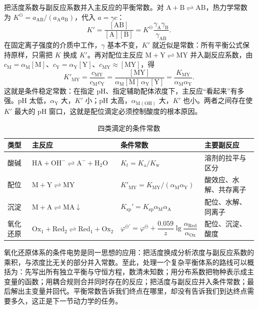 \documentclass[UTF8]{ctexbook}
\begin{document}
把活度系数与副反应系数并入主反应的平衡常数。对 \(\mathrm{A}+\mathrm{B}\rightleftharpoons\mathrm{AB}\)，热力学常数为 \(K^{\ominus}=a_{\mathrm{AB}}/(a_{\mathrm{A}}a_{\mathrm{B}})\)，代入 \(a=\gamma c\)：
\[
K'=\frac{[\mathrm{AB}]}{[\mathrm{A}][\mathrm{B}]}
=K^{\ominus}\frac{\gamma_{\mathrm{A}}\gamma_{\mathrm{B}}}{\gamma_{\mathrm{AB}}}.
\]
在固定离子强度的介质中工作，\(\gamma\) 基本不变，\(K'\) 就近似是常数：所有平衡公式保持原样，只需把 \(K\) 换成 \(K'\)。再对配位主反应 \(\mathrm{M}+\mathrm{Y}\rightleftharpoons\mathrm{MY}\) 并入副反应系数，由 \(c_{\mathrm{M}}=\alpha_{\mathrm{M}}[\mathrm{M}]\)、\(c_{\mathrm{Y}}=\alpha_{\mathrm{Y}}[\mathrm{Y}]\)、\(c_{\mathrm{MY}}\approx[\mathrm{MY}]\)，得
\[
K'_{\mathrm{MY}}
=\frac{c_{\mathrm{MY}}}{c_{\mathrm{M}}c_{\mathrm{Y}}}
=\frac{[\mathrm{MY}]}{\alpha_{\mathrm{M}}[\mathrm{M}]\,\alpha_{\mathrm{Y}}[\mathrm{Y}]}
=\frac{K_{\mathrm{MY}}}{\alpha_{\mathrm{M}}\alpha_{\mathrm{Y}}}.
\]
这就是条件稳定常数：在指定 \(\mathrm{pH}\)、指定辅助配体浓度下，主反应“看起来”有多强。\(\mathrm{pH}\) 太低，\(\alpha_{\mathrm{Y}}\) 大，\(K'\) 小；\(\mathrm{pH}\) 太高，\(\alpha_{\mathrm{M(OH)}}\) 大，\(K'\) 也小。两者之间存在使 \(K'\) 最大的 \(\mathrm{pH}\) 窗口，这就是配位滴定必须控制酸度的根本原因。

\begin{table}[H]
\centering
\caption{四类滴定的条件常数}
\begin{tabular}{p{2.2cm}p{4.2cm}p{4.2cm}p{3.6cm}}
\toprule
类型 & 主反应 & 条件常数 & 主要副反应 \\
\midrule
酸碱 & \(\mathrm{HA}+\mathrm{OH^-}\rightleftharpoons\mathrm{A^-}+\mathrm{H_2O}\) & \(K_t=K_{\mathrm{a}}/K_{\mathrm{w}}\) & 溶剂的拉平与区分 \\
配位 & \(\mathrm{M}+\mathrm{Y}\rightleftharpoons\mathrm{MY}\) & \(K'_{\mathrm{MY}}=K_{\mathrm{MY}}/(\alpha_{\mathrm{M}}\alpha_{\mathrm{Y}})\) & 酸效应、水解、共存离子 \\
沉淀 & \(\mathrm{M}+\mathrm{A}\rightleftharpoons\mathrm{MA}\downarrow\) & \(K_{\mathrm{sp}}'=K_{\mathrm{sp}}\alpha_{\mathrm{M}}\alpha_{\mathrm{A}}\) & 配位、水解、同离子 \\
氧化还原 & \(\mathrm{Ox}_1+\mathrm{Red}_2\rightleftharpoons\mathrm{Red}_1+\mathrm{Ox}_2\) & \(\varphi^{\ominus'}=\varphi^{\ominus}+\dfrac{0.059}{z}\lg\dfrac{\alpha_{\mathrm{Red}}}{\alpha_{\mathrm{Ox}}}\) & 配位、沉淀、酸度 \\
\bottomrule
\end{tabular}
\end{table}

氧化还原体系的条件电势是同一思想的应用：把活度换成分析浓度与副反应系数的乘积，与浓度比无关的部分并入常数。至此，处理一个复杂平衡体系的路线可以概括为：先写出所有独立平衡与守恒方程，数清未知数；用分布系数把物种表示成主变量的函数；用耦合规则合并同时存在的反应；把活度与副反应并入条件常数；最后解出主变量并回代。平衡常数告诉我们终点在哪里，却没有告诉我们到达终点需要多久，这正是下一节动力学的任务。
\end{document}
